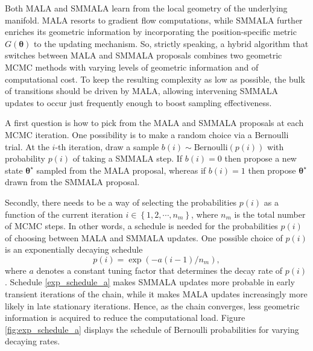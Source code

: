 \documentclass[twoside,11pt]{article}
\begin{document}
Both MALA and SMMALA learn from the local geometry of the underlying manifold. MALA resorts to gradient flow computations, 
while SMMALA further enriches its geometric information by incorporating the position-specific metric 
$G(\boldsymbol{\theta})$ to the updating mechanism. So, strictly speaking, a hybrid algorithm that switches between MALA and 
SMMALA proposals combines two geometric MCMC methods with varying levels of geometric information and of computational cost. 
To keep the resulting complexity as low as possible, the bulk of transitions should be driven by MALA, allowing intervening 
SMMALA updates to occur just frequently enough to boost sampling effectiveness.

A first question is how to pick from the MALA and SMMALA proposals at each MCMC iteration. One possibility is to make a
random choice via a Bernoulli trial. At the $i$-th iteration, draw a sample $b(i)\sim \mbox{Bernoulli}(p(i))$ with
probability $p(i)$ of taking a SMMALA step. If $b(i)=0$ then propose a new state $\boldsymbol{\theta}^{\star}$ sampled from
the MALA proposal, whereas if $b(i)=1$ then propose $\boldsymbol{\theta}^{\star}$ drawn from the SMMALA proposal.

Secondly, there needs to be a way of selecting the probabilities $p(i)$ as a function of the current iteration
$i\in\left\{1,2,\cdots,n_m\right\}$, where $n_m$ is the total number of MCMC steps. In other words, a schedule is needed for
the probabilities $p(i)$ of choosing between MALA and SMMALA updates. One possible choice of $p(i)$ is an exponentially 
decaying schedule
\begin{equation}
\label{exp_schedule_a}
p(i)=\exp{(-a(i-1)/n_m)},
\end{equation}
where $a$ denotes a constant tuning factor that determines the decay rate of $p(i)$.
Schedule \eqref{exp_schedule_a} makes SMMALA updates more probable in early transient iterations of the chain, while it 
makes MALA updates increasingly more likely in late stationary iterations. Hence, as the chain converges, less geometric 
information is acquired to reduce the computational load. Figure \ref{fig:exp_schedule_a} displays the schedule of Bernoulli 
probabilities for varying decaying rates.
\end{document}

